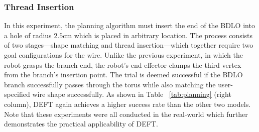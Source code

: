 \subsubsection{Thread Insertion}
In this experiment, the planning algorithm must insert the end of the BDLO into a hole of radius $2.5$cm which is placed in arbitrary location. 
The process consists of two stages—shape matching and thread insertion—which together require two goal configurations for the wire.
Unlike the previous experiment, in which the robot grasps the branch end, the robot’s end effector clamps the third vertex from the branch’s insertion point.
The trial is deemed successful if the BDLO branch successfully passes through the torus while also matching the user-specified wire shape successfully. 
As shown in Table ~\ref{tab:planning} (right column), DEFT again achieves a higher success rate than the other two models.
Note that these experiments were all conducted in the real-world which further demonstrates the practical applicability of DEFT.


